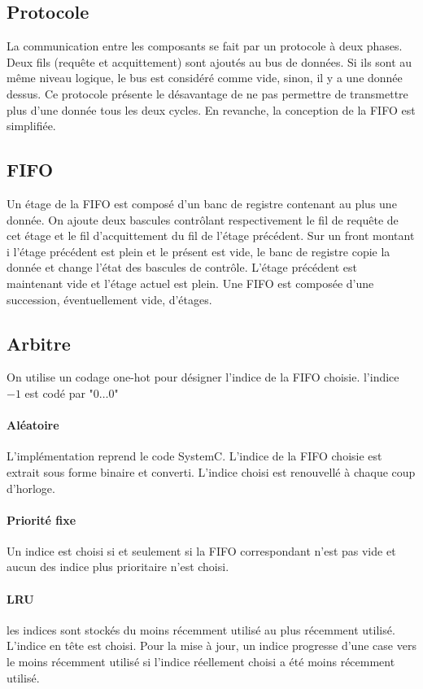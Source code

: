 \documentclass[11pt]{article}
\begin{document}
\subsection{Protocole}
La communication entre les composants se fait par un protocole à deux phases. Deux fils (requête et acquittement) sont ajoutés au bus de données. Si ils sont au même niveau logique, le bus est considéré comme vide, sinon, il y a une donnée dessus. Ce protocole présente le désavantage de ne pas permettre de transmettre plus d'une donnée tous les deux cycles. En revanche, la conception de la FIFO est simplifiée.

\subsection{FIFO}
Un étage de la FIFO est composé d'un banc de registre contenant au plus une donnée. On ajoute deux bascules contrôlant respectivement le fil de requête de cet étage et le fil d'acquittement du fil de l'étage précédent. Sur un front montant i l'étage précédent est plein et le présent est vide, le banc de registre copie la donnée et change l'état des bascules de contrôle. L'étage précédent est maintenant vide et l'étage actuel est plein.
Une FIFO est composée d'une succession, éventuellement vide, d'étages.

\subsection{Arbitre}
On utilise un codage one-hot pour désigner l'indice de la FIFO choisie. l'indice $-1$ est codé par "$0\dots0$"
\paragraph{Aléatoire}
L'implémentation reprend le code SystemC. L'indice de la FIFO choisie est extrait sous forme binaire et converti. L'indice choisi est renouvellé à chaque coup d'horloge.
\paragraph{Priorité fixe}
Un indice est choisi si et seulement si la FIFO correspondant n'est pas vide et aucun des indice plus prioritaire n'est choisi.
\paragraph{LRU}
les indices sont stockés du moins récemment utilisé au plus récemment utilisé. L'indice en tête est choisi. Pour la mise à jour, un indice progresse d'une case vers le moins récemment utilisé si l'indice réellement choisi a été moins récemment utilisé.
\end{document}
